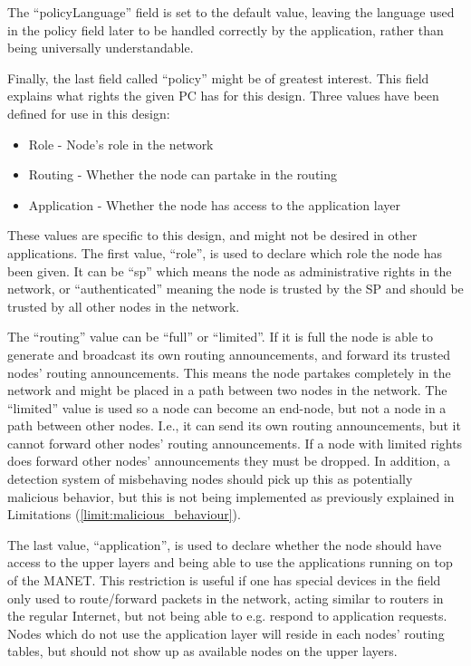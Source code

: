The ``policyLanguage'' field is set to the default value, leaving the
language used in the policy field later to be handled correctly by the
application, rather than being universally understandable.

Finally, the last field called ``policy'' might be of greatest interest. This
field explains what rights the given \ac{PC} has for this design. Three values
have been defined for use in this design:

\begin{itemize}
  \item Role - Node's role in the network
  \item Routing - Whether the node can partake in the routing
  \item Application - Whether the node has access to the application layer
\end{itemize}

These values are specific to this design, and might not be desired in
other applications. The first value, ``role'', is used to declare which role the
node has been given. It can be ``sp'' which means the node as administrative
rights in the network, or ``authenticated'' meaning the node is trusted by the
\ac{SP} and should be trusted by all other nodes in the network.

The ``routing'' value can be ``full'' or ``limited''. If it is full the node is
able to generate and broadcast its own routing announcements, and forward its
trusted nodes' routing announcements. This means the node partakes completely in
the network and might be placed in a path between two nodes in the network. The
``limited'' value is used so a node can become an end-node, but not a node in a
path between other nodes. I.e., it can send its own routing announcements, but
it cannot forward other nodes' routing announcements. If a node with limited
rights does forward other nodes' announcements they must be dropped. In
addition, a detection system of misbehaving nodes should pick up this as
potentially malicious behavior, but this is not being implemented as
previously explained in Limitations (\ref{limit:malicious_behaviour}).

The last value, ``application'', is used to declare whether the node should have
access to the upper layers and being able to use the applications running on top
of the \ac{MANET}. This restriction is useful if one has special devices in the
field only used to route/forward packets in the network, acting similar to
routers in the regular Internet, but not being able to e.g. respond to
application requests. Nodes which do not use the application layer will reside
in each nodes' routing tables, but should not show up as available nodes on the
upper layers.

